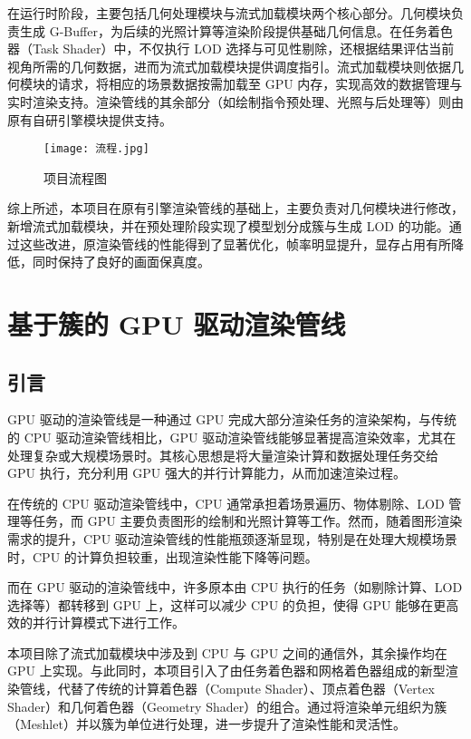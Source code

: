 \par 在运行时阶段，主要包括几何处理模块与流式加载模块两个核心部分。几何模块负责生成 G-Buffer\cite{lauritzen2010}，为后续的光照计算等渲染阶段提供基础几何信息。在任务着色器（Task Shader）中，不仅执行 LOD 选择与可见性剔除，还根据结果评估当前视角所需的几何数据，进而为流式加载模块提供调度指引。流式加载模块则依据几何模块的请求，将相应的场景数据按需加载至 GPU 内存，实现高效的数据管理与实时渲染支持。渲染管线的其余部分（如绘制指令预处理、光照与后处理等）则由原有自研引擎模块提供支持。

\begin{figure}[htbp]
    \centering
    \texttt{[image: 流程.jpg]}
    \caption{\label{fig:流程}项目流程图}
\end{figure}

\par 综上所述，本项目在原有引擎渲染管线的基础上，主要负责对几何模块进行修改，新增流式加载模块，并在预处理阶段实现了模型划分成簇与生成 LOD 的功能。通过这些改进，原渲染管线的性能得到了显著优化，帧率明显提升，显存占用有所降低，同时保持了良好的画面保真度。

\section{基于簇的 GPU 驱动渲染管线}

\subsection{引言}

GPU 驱动的渲染管线是一种通过 GPU 完成大部分渲染任务的渲染架构，与传统的 CPU 驱动渲染管线相比，GPU 驱动渲染管线能够显著提高渲染效率，尤其在处理复杂或大规模场景时。其核心思想是将大量渲染计算和数据处理任务交给 GPU 执行，充分利用 GPU 强大的并行计算能力，从而加速渲染过程。

在传统的 CPU 驱动渲染管线中，CPU 通常承担着场景遍历、物体剔除、LOD 管理等任务，而 GPU 主要负责图形的绘制和光照计算等工作。然而，随着图形渲染需求的提升，CPU 驱动渲染管线的性能瓶颈逐渐显现，特别是在处理大规模场景时，CPU 的计算负担较重，出现渲染性能下降等问题\cite{Tian2024}。

而在 GPU 驱动的渲染管线中，许多原本由 CPU 执行的任务（如剔除计算、LOD 选择等）都转移到 GPU 上，这样可以减少 CPU 的负担，使得 GPU 能够在更高效的并行计算模式下进行工作。

本项目除了流式加载模块中涉及到 CPU 与 GPU 之间的通信外，其余操作均在 GPU 上实现。与此同时，本项目引入了由任务着色器和网格着色器组成的新型渲染管线，代替了传统的计算着色器（Compute Shader）、顶点着色器（Vertex Shader）和几何着色器（Geometry Shader）的组合。通过将渲染单元组织为簇（Meshlet）并以簇为单位进行处理，进一步提升了渲染性能和灵活性\cite{Czubala2024}。

